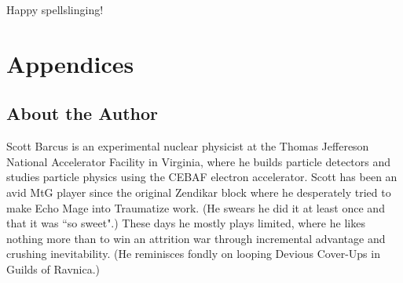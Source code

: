 \documentclass[oneside]{book}   %
\begin{document}
Happy spellslinging!

\appendix
\section*{Appendices}
\renewcommand{\thesubsection}{\Alph{subsection}}
\subsection{About the Author}

Scott Barcus is an experimental nuclear physicist at the Thomas Jeffereson National Accelerator Facility in Virginia, where he builds particle detectors and studies particle physics using the CEBAF electron accelerator. Scott has been an avid MtG player since the original Zendikar block where he desperately tried to make Echo Mage into Traumatize work. (He swears he did it at least once and that it was ``so sweet".) These days he mostly plays limited, where he likes nothing more than to win an attrition war through incremental advantage and crushing inevitability. (He reminisces fondly on looping Devious Cover-Ups in Guilds of Ravnica.)  




\end{document}
